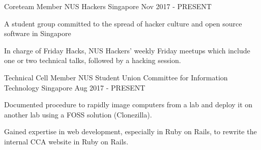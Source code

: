 

\begin{cventries}

 \cventry
    {Coreteam Member} %
    {NUS Hackers} %
    {Singapore} %
    {Nov 2017 - PRESENT} %
    {
      \begin{cvitems} %
      	\item {A student group committed to the spread of hacker culture and open source software in Singapore}
      	\item {In charge of Friday Hacks, NUS Hackers' weekly Friday meetups which include one or two technical talks, followed by a hacking session.}
      \end{cvitems}
    }
    
  \cventry
    {Technical Cell Member} %
    {NUS Student Union Committee for Information Technology} %
    {Singapore} %
    {Aug 2017 - PRESENT} %
    {
      \begin{cvitems} %
      	\item {Documented procedure to rapidly image computers from a lab and deploy it on another lab using a FOSS solution (Clonezilla).}
        \item {Gained expertise in web development, especially in Ruby on Rails, to rewrite the internal CCA website in Ruby on Rails.}
      \end{cvitems}
    }
    
\end{cventries}
